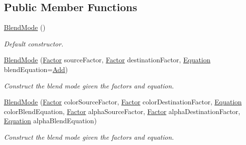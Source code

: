 \subsection*{Public Member Functions}
\begin{DoxyCompactItemize}
\item 
\hyperlink{structsf_1_1_blend_mode_a7faef75eae1fb47bbe93f45f38e3d345}{Blend\+Mode} ()
\begin{DoxyCompactList}\small\item\em Default constructor. \end{DoxyCompactList}\item 
\hyperlink{structsf_1_1_blend_mode_a23c7452cc8e9eb943c3aea6234ce4297}{Blend\+Mode} (\hyperlink{structsf_1_1_blend_mode_afb9852caf356b53bb0de460c58a9ebbb}{Factor} source\+Factor, \hyperlink{structsf_1_1_blend_mode_afb9852caf356b53bb0de460c58a9ebbb}{Factor} destination\+Factor, \hyperlink{structsf_1_1_blend_mode_a7bce470e2e384c4f9c8d9595faef7c32}{Equation} blend\+Equation=\hyperlink{structsf_1_1_blend_mode_a7bce470e2e384c4f9c8d9595faef7c32a50c081d8f36cf7b77632966e15d38966}{Add})
\begin{DoxyCompactList}\small\item\em Construct the blend mode given the factors and equation. \end{DoxyCompactList}\item 
\hyperlink{structsf_1_1_blend_mode_a69a12c596114e77126616e7e0f7d798b}{Blend\+Mode} (\hyperlink{structsf_1_1_blend_mode_afb9852caf356b53bb0de460c58a9ebbb}{Factor} color\+Source\+Factor, \hyperlink{structsf_1_1_blend_mode_afb9852caf356b53bb0de460c58a9ebbb}{Factor} color\+Destination\+Factor, \hyperlink{structsf_1_1_blend_mode_a7bce470e2e384c4f9c8d9595faef7c32}{Equation} color\+Blend\+Equation, \hyperlink{structsf_1_1_blend_mode_afb9852caf356b53bb0de460c58a9ebbb}{Factor} alpha\+Source\+Factor, \hyperlink{structsf_1_1_blend_mode_afb9852caf356b53bb0de460c58a9ebbb}{Factor} alpha\+Destination\+Factor, \hyperlink{structsf_1_1_blend_mode_a7bce470e2e384c4f9c8d9595faef7c32}{Equation} alpha\+Blend\+Equation)
\begin{DoxyCompactList}\small\item\em Construct the blend mode given the factors and equation. \end{DoxyCompactList}\end{DoxyCompactItemize}
